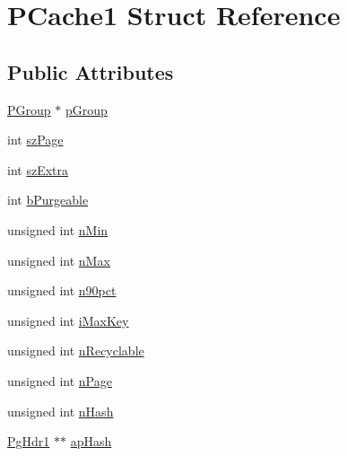\hypertarget{struct_p_cache1}{\section{P\-Cache1 Struct Reference}
\label{struct_p_cache1}
}
\subsection*{Public Attributes}
\begin{DoxyCompactItemize}
\item 
\hyperlink{struct_p_group}{P\-Group} $\ast$ \hyperlink{struct_p_cache1_ae3389f0c68d6946a1eebeeee835ece69}{p\-Group}
\item 
int \hyperlink{struct_p_cache1_a1425039a858b7518c097d8ae92597de0}{sz\-Page}
\item 
int \hyperlink{struct_p_cache1_a1e96e6671732e0af641732991b681ede}{sz\-Extra}
\item 
int \hyperlink{struct_p_cache1_a2af7d24e27369252addec9bef45afcfc}{b\-Purgeable}
\item 
unsigned int \hyperlink{struct_p_cache1_a9e96c79ec60c2e368f92a2ba52d01c44}{n\-Min}
\item 
unsigned int \hyperlink{struct_p_cache1_aef08139a0b86b0c0a7ee2bec0bab2405}{n\-Max}
\item 
unsigned int \hyperlink{struct_p_cache1_a8a5c5ab7d71e66c2a4df3f22513888f0}{n90pct}
\item 
unsigned int \hyperlink{struct_p_cache1_a2dff616ad2d1873ad3a8d20d53bcb4d0}{i\-Max\-Key}
\item 
unsigned int \hyperlink{struct_p_cache1_a3501394bd251f08d1f9d26d3b2d4c67c}{n\-Recyclable}
\item 
unsigned int \hyperlink{struct_p_cache1_ace332c276e28352992529f60f0ac457c}{n\-Page}
\item 
unsigned int \hyperlink{struct_p_cache1_a09d9488a8a3a52822e33dd43e14c69e1}{n\-Hash}
\item 
\hyperlink{struct_pg_hdr1}{Pg\-Hdr1} $\ast$$\ast$ \hyperlink{struct_p_cache1_a1169ec7ba2a628d89841d16ced651e1f}{ap\-Hash}
\end{DoxyCompactItemize}


